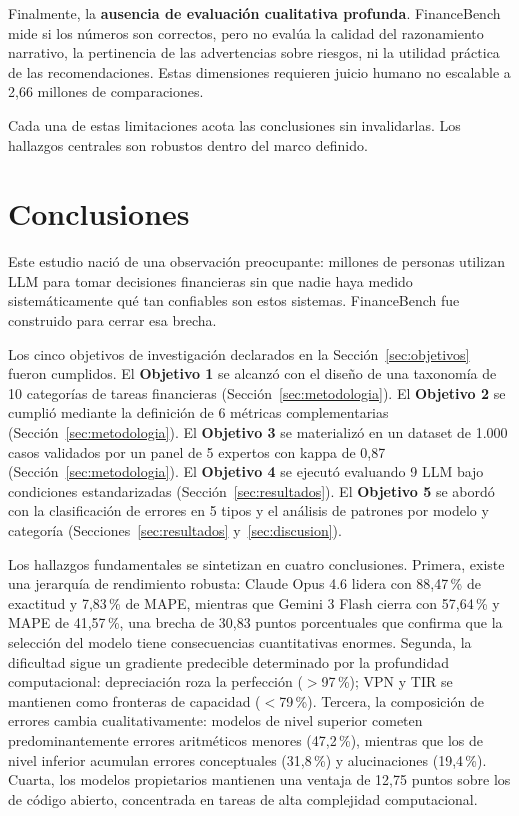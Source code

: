 \documentclass[12pt,a4paper]{article}
\begin{document}
Finalmente, la \textbf{ausencia de evaluación cualitativa profunda}. FinanceBench mide si los números son correctos, pero no evalúa la calidad del razonamiento narrativo, la pertinencia de las advertencias sobre riesgos, ni la utilidad práctica de las recomendaciones. Estas dimensiones requieren juicio humano no escalable a 2,66 millones de comparaciones.

Cada una de estas limitaciones acota las conclusiones sin invalidarlas. Los hallazgos centrales son robustos dentro del marco definido.

\section{Conclusiones}\label{sec:conclusiones}

Este estudio nació de una observación preocupante: millones de personas utilizan LLM para tomar decisiones financieras sin que nadie haya medido sistemáticamente qué tan confiables son estos sistemas. FinanceBench fue construido para cerrar esa brecha.

Los cinco objetivos de investigación declarados en la Sección~\ref{sec:objetivos} fueron cumplidos. El \textbf{Objetivo 1} se alcanzó con el diseño de una taxonomía de 10 categorías de tareas financieras (Sección~\ref{sec:metodologia}). El \textbf{Objetivo 2} se cumplió mediante la definición de 6 métricas complementarias (Sección~\ref{sec:metodologia}). El \textbf{Objetivo 3} se materializó en un dataset de 1.000 casos validados por un panel de 5 expertos con kappa de 0,87 (Sección~\ref{sec:metodologia}). El \textbf{Objetivo 4} se ejecutó evaluando 9 LLM bajo condiciones estandarizadas (Sección~\ref{sec:resultados}). El \textbf{Objetivo 5} se abordó con la clasificación de errores en 5 tipos y el análisis de patrones por modelo y categoría (Secciones~\ref{sec:resultados} y~\ref{sec:discusion}).

Los hallazgos fundamentales se sintetizan en cuatro conclusiones. Primera, existe una jerarquía de rendimiento robusta: Claude Opus 4.6 lidera con 88,47\,\% de exactitud y 7,83\,\% de MAPE, mientras que Gemini 3 Flash cierra con 57,64\,\% y MAPE de 41,57\,\%, una brecha de 30,83 puntos porcentuales que confirma que la selección del modelo tiene consecuencias cuantitativas enormes. Segunda, la dificultad sigue un gradiente predecible determinado por la profundidad computacional: depreciación roza la perfección ($>$97\,\%); VPN y TIR se mantienen como fronteras de capacidad ($<$79\,\%). Tercera, la composición de errores cambia cualitativamente: modelos de nivel superior cometen predominantemente errores aritméticos menores (47,2\,\%), mientras que los de nivel inferior acumulan errores conceptuales (31,8\,\%) y alucinaciones (19,4\,\%). Cuarta, los modelos propietarios mantienen una ventaja de 12,75 puntos sobre los de código abierto, concentrada en tareas de alta complejidad computacional.
\end{document}
